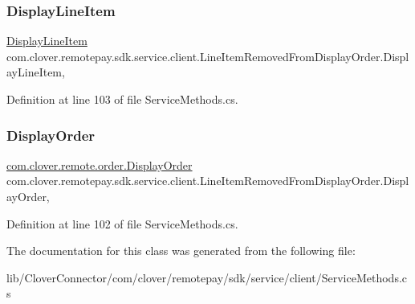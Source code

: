 \subsubsection{\texorpdfstring{Display\+Line\+Item}{DisplayLineItem}}
{\footnotesize\ttfamily \hyperlink{classcom_1_1clover_1_1remote_1_1order_1_1_display_line_item}{Display\+Line\+Item} com.\+clover.\+remotepay.\+sdk.\+service.\+client.\+Line\+Item\+Removed\+From\+Display\+Order.\+Display\+Line\+Item\hspace{0.3cm}{\ttfamily [get]}, {\ttfamily [set]}}



Definition at line 103 of file Service\+Methods.\+cs.

\mbox{\label{classcom_1_1clover_1_1remotepay_1_1sdk_1_1service_1_1client_1_1_line_item_removed_from_display_order_ab9c1027976168a136c0385129994541e}} 
\subsubsection{\texorpdfstring{Display\+Order}{DisplayOrder}}
{\footnotesize\ttfamily \hyperlink{classcom_1_1clover_1_1remote_1_1order_1_1_display_order}{com.\+clover.\+remote.\+order.\+Display\+Order} com.\+clover.\+remotepay.\+sdk.\+service.\+client.\+Line\+Item\+Removed\+From\+Display\+Order.\+Display\+Order\hspace{0.3cm}{\ttfamily [get]}, {\ttfamily [set]}}



Definition at line 102 of file Service\+Methods.\+cs.



The documentation for this class was generated from the following file\+:\begin{DoxyCompactItemize}
\item 
lib/\+Clover\+Connector/com/clover/remotepay/sdk/service/client/Service\+Methods.\+cs\end{DoxyCompactItemize}
